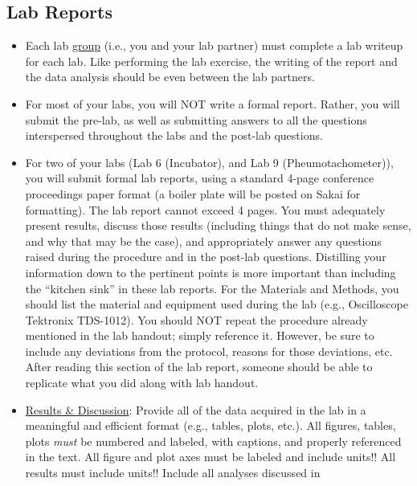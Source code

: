 \subsection{Lab Reports}
\begin{itemize}
    \item Each lab \underline{group} (i.e., you and your lab partner) must
        complete a lab writeup for each lab.  Like performing the lab exercise,
        the writing of the report and the data analysis should be even between
        the lab partners.
    
\item For most of your labs, you will NOT write a formal report. Rather, you will submit the pre-lab, as well as submitting answers to all the questions 
interspersed throughout the labs and the post-lab questions.
    \item  For two of your labs (Lab 6 (Incubator), and Lab 9 
(Pheumotachometer)), you will submit formal lab reports, using a standard
4-page conference proceedings paper format (a boiler plate will be posted on
Sakai for formatting).  The lab report cannot exceed 4 pages.
        You must adequately present results, discuss those results
        (including things that do not make sense, and why that may be the
        case), and appropriately answer any questions raised during the
        procedure and in the post-lab questions.  Distilling your information
        down to the pertinent points is more important than including the
        ``kitchen sink'' in these lab reports.
	For the Materials and Methods, you  should
        list the material and equipment
            used during the lab (e.g., Oscilloscope Tektronix TDS-1012).  You
           should NOT repeat the procedure already mentioned in the lab
            handout; simply reference it.  However, be sure to
include any deviations from the protocol,
            reasons for those deviations, etc.  After reading this section of
            the lab report, someone should be able to replicate what you did
            along with lab handout.
        \item \underline{Results \& Discussion}: Provide all of the data
            acquired in the lab in a meaningful and efficient format (e.g.,
            tables, plots, etc.).  All figures, tables, plots \emph{must} be
            numbered and labeled, with captions, and properly referenced in the
            text.  All figure and plot axes must be labeled and include units!!
            All results must include units!! Include all analyses discussed in

\end{itemize}
